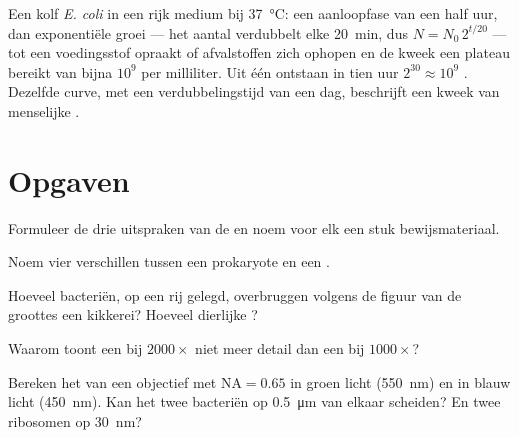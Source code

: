 \begin{example}\label{ex:b1:cell-unit-of-life:growthcurve}
Een kolf \emph{E. coli} in een rijk medium bij \qty{37}{\celsius}: een
aanloopfase van een half uur, dan exponentiële groei --- het aantal verdubbelt
elke \qty{20}{min}, dus $N = N_0\,2^{t/20}$ --- tot een voedingsstof opraakt of
afvalstoffen zich ophopen en de kweek een plateau bereikt van bijna $10^9$ 
per milliliter. Uit één  ontstaan in tien uur $2^{30} \approx 10^9$ .
Dezelfde curve, met een verdubbelingstijd van een dag, beschrijft een kweek van
menselijke .
\end{example}

\section{Opgaven}

\begin{exercise}[$\star$]\label{exo:b1:cell-unit-of-life:1}
Formuleer de drie uitspraken van de  en noem voor elk een stuk
bewijsmateriaal.
\end{exercise}

\begin{exercise}[$\star$]\label{exo:b1:cell-unit-of-life:2}
Noem vier verschillen tussen een prokaryote en een .
\end{exercise}

\begin{exercise}[$\star$]\label{exo:b1:cell-unit-of-life:3}
Hoeveel bacteriën, op een rij gelegd, overbruggen volgens de figuur van de
groottes een kikkerei? Hoeveel dierlijke ?
\end{exercise}

\begin{exercise}[$\star$]\label{exo:b1:cell-unit-of-life:4}
Waarom toont een  bij $2000\times$ niet meer detail dan een bij
$1000\times$?
\end{exercise}

\begin{exercise}[$\star\star$]\label{exo:b1:cell-unit-of-life:5}
Bereken het  van een objectief met $\mathrm{NA} = 0.65$ in
groen licht (\qty{550}{nm}) en in blauw licht (\qty{450}{nm}). Kan het twee
bacteriën op \qty{0.5}{\micro m} van elkaar scheiden? En twee ribosomen op
\qty{30}{nm}?
\end{exercise}

